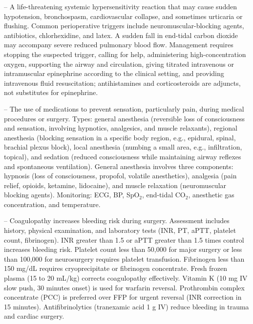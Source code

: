 -- A life-threatening systemic hypersensitivity reaction that may cause sudden hypotension, bronchospasm, cardiovascular collapse, and sometimes urticaria or flushing. Common perioperative triggers include neuromuscular-blocking agents, antibiotics, chlorhexidine, and latex. A sudden fall in end-tidal carbon dioxide may accompany severe reduced pulmonary blood flow. Management requires stopping the suspected trigger, calling for help, administering high-concentration oxygen, supporting the airway and circulation, giving titrated intravenous or intramuscular epinephrine according to the clinical setting, and providing intravenous fluid resuscitation; antihistamines and corticosteroids are adjuncts, not substitutes for epinephrine.

-- The use of medications to prevent sensation, particularly pain, during medical procedures or surgery. Types: general anesthesia (reversible loss of consciousness and sensation, involving hypnotics, analgesics, and muscle relaxants), regional anesthesia (blocking sensation in a specific body region, e.g., epidural, spinal, brachial plexus block), local anesthesia (numbing a small area, e.g., infiltration, topical), and sedation (reduced consciousness while maintaining airway reflexes and spontaneous ventilation). General anesthesia involves three components: hypnosis (loss of consciousness, propofol, volatile anesthetics), analgesia (pain relief, opioids, ketamine, lidocaine), and muscle relaxation (neuromuscular blocking agents). Monitoring: ECG, BP, SpO$_2$, end-tidal CO$_2$, anesthetic gas concentration, and temperature.

-- Coagulopathy increases bleeding risk during surgery. Assessment includes history, physical examination, and laboratory tests (INR, PT, aPTT, platelet count, fibrinogen). INR greater than 1.5 or aPTT greater than 1.5 times control increases bleeding risk. Platelet count less than 50,000 for major surgery or less than 100,000 for neurosurgery requires platelet transfusion. Fibrinogen less than 150 mg/dL requires cryoprecipitate or fibrinogen concentrate. Fresh frozen plasma (15 to 20 mL/kg) corrects coagulopathy effectively. Vitamin K (10 mg IV slow push, 30 minutes onset) is used for warfarin reversal. Prothrombin complex concentrate (PCC) is preferred over FFP for urgent reversal (INR correction in 15 minutes). Antifibrinolytics (tranexamic acid 1 g IV) reduce bleeding in trauma and cardiac surgery.

